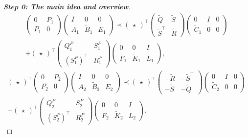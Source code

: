 \documentclass[11pt,a4paper,oneside,DIV=12,headings=small]{scrartcl}
\theoremstyle{plain}
\begin{document}
\begin{proof}[\textbf{Step 0: \textit{The main idea and overview}}]
\begin{multline}
\begin{pmatrix} 0 & P_1 \\ P_1 & 0 \end{pmatrix} 
\begin{pmatrix} I & 0  & 0 \\ A_1 & \tilde{B}_1 & E_1  \end{pmatrix}
\prec
\begin{pmatrix} \star  \end{pmatrix}^\top
\begin{pmatrix} \tilde{Q} & \tilde{S} \\ \tilde{S}^\top & \tilde{R} \end{pmatrix}
\begin{pmatrix} 0 & I & 0 \\ \tilde{C}_1 & 0 & 0  \end{pmatrix} \\
+\begin{pmatrix} \star  \end{pmatrix}^\top
\begin{pmatrix} Q^P_1 & S^P_1 \\ (S^P_1)^\top & R^P_1 \end{pmatrix}
\begin{pmatrix} 0 & 0 & I \\ F_1 & \tilde{K}_1 & L_1  \end{pmatrix},
\end{multline}
\begin{multline}
\label{D2}
\begin{pmatrix} \star  \end{pmatrix}^\top
\begin{pmatrix} 0 & P_2 \\ P_2 & 0 \end{pmatrix} 
\begin{pmatrix} I & 0  & 0 \\ A_2 & \tilde{B}_2 & E_2  \end{pmatrix}
\prec
\begin{pmatrix} \star  \end{pmatrix}^\top
\begin{pmatrix} -\tilde{R} & -\tilde{S}^\top \\ -\tilde{S} & -\tilde{Q} \end{pmatrix}
\begin{pmatrix} 0 & I & 0 \\ \tilde{C}_2 & 0 & 0  \end{pmatrix} \\
+\begin{pmatrix} \star  \end{pmatrix}^\top
\begin{pmatrix} Q^P_2 & S^P_2 \\ (S^P_2)^\top & R^P_2 \end{pmatrix}
\begin{pmatrix} 0 & 0 & I \\ F_2 & \tilde{K}_2 & L_2  \end{pmatrix}.
\end{multline}  


\end{proof}
\end{document}
